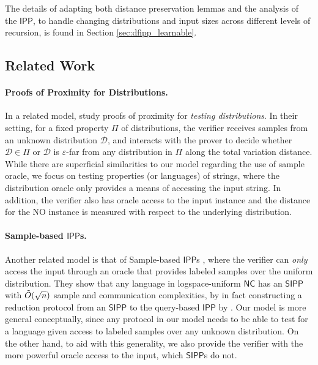 \documentclass[10pt,a4paper]{article}
\newcommand{\NC}{\mathsf{NC}}
\newcommand{\IPP}{\mathsf{IPP}}
\newcommand{\sD}{\mathcal{D}}
\begin{document}
The details of adapting both distance preservation lemmas and the analysis of the $\IPP$, to handle changing distributions and input sizes across different levels of recursion, is found in Section \ref{sec:dfipp_learnable}.

\subsection{Related Work}
\label{sec:rel_work}

\paragraph{Proofs of Proximity for Distributions.} In a related model, \cite{CG18,HR22} study proofs of proximity for \textit{testing distributions}. In their setting, for a fixed property $\Pi$ of distributions, the verifier receives samples from an unknown distribution $\sD$, and interacts with the prover to decide whether $\sD \in \Pi$ or $\sD$ is $\varepsilon$-far from any distribution in $\Pi$ along the total variation distance. While there are superficial similarities to our model regarding the use of sample oracle, we focus on testing properties (or languages) of strings, where the distribution oracle only provides a means of accessing the input string. In addition, the verifier also has oracle access to the input instance and the distance for the NO instance is measured with respect to the underlying distribution. 

\paragraph{Sample-based $\IPP$s.} Another related model is that of Sample-based $\IPP$s \cite{GR22_sample}, where the verifier can \textit{only} access the input through an oracle that provides labeled samples over the uniform distribution. They show that any language in logspace-uniform $\NC$ has an $\mathsf{SIPP}$ with $\Tilde{O}(\sqrt{n})$ sample and communication complexities, by in fact constructing a reduction protocol from an $\mathsf{SIPP}$ to the query-based $\IPP$ by \cite{RVW}. Our model is more general conceptually, since any protocol in our model needs to be able to test for a language given access to labeled samples over any unknown distribution. On the other hand, to aid with this generality, we also provide the verifier with the more powerful oracle access to the input, which $\mathsf{SIPP}$s do not. 
\end{document}
